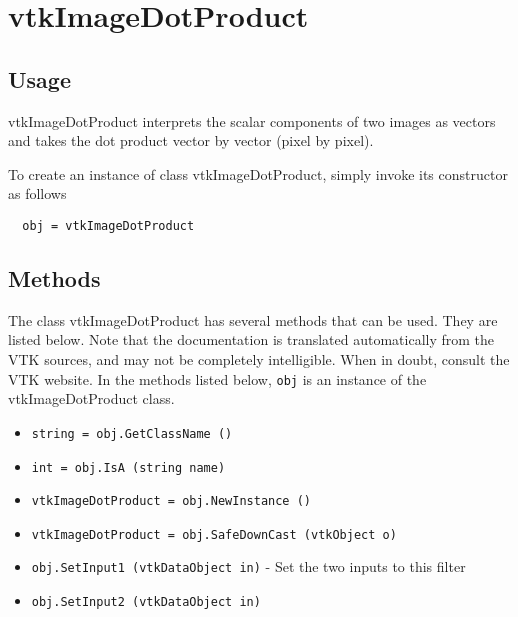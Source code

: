 \section{vtkImageDotProduct}

\subsection{Usage}

 vtkImageDotProduct interprets the scalar components of two images
 as vectors and takes the dot product vector by vector (pixel by pixel).

To create an instance of class vtkImageDotProduct, simply
invoke its constructor as follows
\begin{verbatim}
  obj = vtkImageDotProduct
\end{verbatim}
\subsection{Methods}

The class vtkImageDotProduct has several methods that can be used.
  They are listed below.
Note that the documentation is translated automatically from the VTK sources,
and may not be completely intelligible.  When in doubt, consult the VTK website.
In the methods listed below, \verb|obj| is an instance of the vtkImageDotProduct class.
\begin{itemize}
\item  \verb|string = obj.GetClassName ()|

\item  \verb|int = obj.IsA (string name)|

\item  \verb|vtkImageDotProduct = obj.NewInstance ()|

\item  \verb|vtkImageDotProduct = obj.SafeDownCast (vtkObject o)|

\item  \verb|obj.SetInput1 (vtkDataObject in)| -  Set the two inputs to this filter

\item  \verb|obj.SetInput2 (vtkDataObject in)|

\end{itemize}

